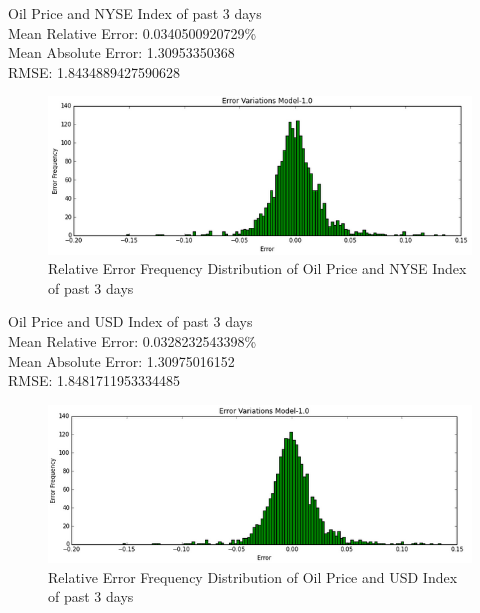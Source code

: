 \documentclass[runningheads]{llncs}
\begin{document}
Oil Price and NYSE Index of past 3 days \\
Mean Relative Error: 0.0340500920729\% \\
Mean Absolute Error: 1.30953350368 \\
RMSE: 1.8434889427590628 \\
\begin{figure}
\centering
\includegraphics[width=\textwidth]{OILNYSE_Daily.png}
\caption{Relative Error Frequency Distribution of Oil Price and NYSE Index of past 3 days}
\label{fig:OILNYSE_Daily.png}
\end{figure}

Oil Price and USD Index of past 3 days \\
Mean Relative Error: 0.0328232543398\% \\
Mean Absolute Error: 1.30975016152 \\
RMSE: 1.8481711953334485 \\
\begin{figure}
\centering
\includegraphics[width=\textwidth]{OILUSD_Daily.png}
\caption{Relative Error Frequency Distribution of Oil Price and USD Index of past 3 days}
\label{fig:OILUSD_Daily.png}
\end{figure}
\end{document}
